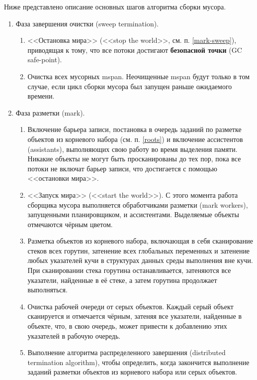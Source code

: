 Ниже представлено описание основных шагов алгоритма сборки мусора.~\cite{golang_gc}

\begin{enumerate}[label*=\arabic*.]
	\item Фаза завершения очистки (sweep termination).
	\begin{enumerate}[label*=\arabic*.]
		\item <<Остановка мира>> (<<stop the world>>, см. п. \ref{mark-sweep}), приводящая к тому, что все потоки достигают \textbf{безопасной точки} (GC safe-point).
		\item Очистка всех мусорных mspan. Неочищенные mspan будут только в том случае, если цикл сборки мусора был запущен раньше ожидаемого времени.
	\end{enumerate}

	\item Фаза разметки (mark).
	\begin{enumerate}[label*=\arabic*.]
		\item Включение барьера записи, постановка в очередь заданий по разметке объектов из корневого набора (см. п. \ref{roots}) и включение ассистентов (assistants), выполняющих свою работу во время выделения памяти. Никакие объекты не могут быть просканированы до тех пор, пока все потоки не включат барьер записи, что достигается с помощью <<остановки мира>>.
		\item <<Запуск мира>> (<<start the world>>). С этого момента работа сборщика мусора выполняется обработчиками разметки (mark workers), запущенными планировщиком, и ассистентами. Выделяемые объекты отмечаются чёрным цветом.
		\item Разметка объектов из корневого набора, включающая в себя сканирование стеков всех горутин, затенение всех глобальных переменных и затенение любых указателей кучи в структурах данных среды выполнения вне кучи. При сканировании стека горутина останавливается, затеняются все указатели, найденные в её стеке, а затем горутина продолжает выполняться.
		\item Очистка рабочей очереди от серых объектов. Каждый серый объект сканируется и отмечается чёрным, затеняя все указатели, найденные в объекте, что, в свою очередь, может привести к добавлению этих указателей в рабочую очередь.
		\item Выполнение алгоритма распределенного завершения (distributed termination algorithm), чтобы определить, когда закончится выполнение заданий разметки объектов из корневого набора или серых объектов.
	\end{enumerate}


\end{enumerate}
